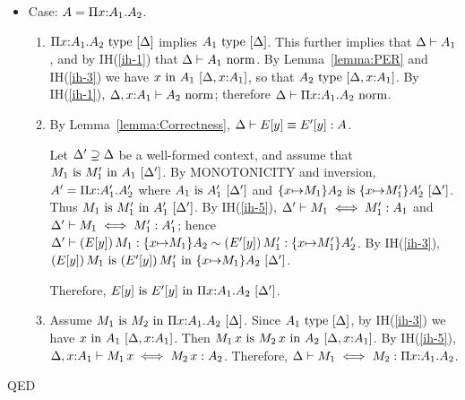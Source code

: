 \documentclass{article}
\theoremstyle{break}
\newcommand{\qed}{\mbox{QED}}
\newenvironment{proof}{\noindent{\bf Proof:}\hspace*{0.5em}}{\hspace*{\fill}\qed}
\begin{document}
\begin{proof}
\begin{itemize}
\item Case: $\kind=\kpi{\cvar}{\kind_1}{\kind_2}$.
\begin{enumerate}

\item 
$\semanticvalidtype{\world}{\kpi{\cvar}{\kind_1}{\kind_2}}$ implies
$\semanticvalidtype{\world}{\kind_1}$.  This further implies that
$\validkind{\world}{\kind_1}$, and
by IH(\ref{ih-1}) that $\normtype{\world}{\kind_1}$.
By Lemma~\ref{lemma:PER} and
IH(\ref{ih-3}) we have 
$\semanticvalidterm{\world,\cvar{:}\kind_1}{\cvar}{\kind_1}$,
so that
$\semanticvalidtype{\world,\cvar{:}\kind_1}{\kind_2}$.  By IH(\ref{ih-1}),
$\normtype{\world,\cvar{:}\kind_1}{\kind_2}$; therefore
$\normtype{\world}{\kpi{\cvar}{\kind_1}{\kind_2}}$.

\item By Lemma~\ref{lemma:Correctness}, 
$\equivconstructor{\world}{E[\othercvar]}{E'[\othercvar]}{\kind}$.


Let $\world'\supseteq\world$ be a well-formed context, and assume that
$\semanticequivterm{\world'}{\constructor_1}{\constructor'_1}{\kind_1}$.
By MONOTONICITY and inversion, 
$\kind' = \kpi{\cvar}{\kind'_1}{\kind'_2}$ where
$\semanticequivtype{\world'}{\kind_1}{\kind'_1}$ and
$\semanticequivtype{\world'}{\substitute{\cvar}{\constructor_1}{\kind_2}}
   {\substitute{\cvar}{\constructor'_1}{\kind'_2}}$.
Thus $\semanticequivterm{\world'}{\constructor_1}{\constructor'_1}{\kind'_1}$.
By IH(\ref{ih-5}), 
$\aconequiv{\world'}{\constructor_1}{\constructor'_1}{\kind_1}$ and
$\aconequiv{\world'}{\constructor_1}{\constructor'_1}{\kind'_1}$;
hence 
$\weakconequiv{\world'}{\capply{(E[\othercvar])}{\constructor_1}}{\substitute{\cvar}{\constructor_1}{\kind_2}}
   {\capply{(E'[\othercvar])}{\constructor'_1}}{\substitute{\cvar}{\constructor'_1}{\kind'_2}}$.
By IH(\ref{ih-3}), 
$\semanticequivterm{\world'}{\capply{(E[\othercvar])}{\constructor_1}}
   {\capply{(E'[\othercvar])}{\constructor'_1}}{\substitute{\cvar}{\constructor_1}{\kind_2}}$.

Therefore, 
$\semanticequivterm{\world'}{E[\othercvar]}{E'[\othercvar]}{\kpi{\cvar}{\kind_1}{\kind_2}}$.

\item 
Assume $\semanticequivterm{\world}{\constructor_1}{\constructor_2}{\kpi{\cvar}{\kind_1}{\kind_2}}$.
Since $\semanticvalidtype{\world}{\kind_1}$, by
IH(\ref{ih-3}) we have
$\semanticvalidterm{\world,\cvar{:}\kind_1}{\cvar}{\kind_1}$.  Then
$\semanticequivterm{\world,\cvar{:}{\kind_1}}{\capply{\constructor_1}{\cvar}}
   {\capply{\constructor_2}{\cvar}}{\kind_2}$.
By IH(\ref{ih-5}), 
$\aconequiv{\world,\cvar{:}{\kind_1}}{\capply{\constructor_1}{\cvar}}
   {\capply{\constructor_2}{\cvar}}{\kind_2}$.
Therefore,
$\aconequiv{\world}{\constructor_1}{\constructor_2}{\kpi{\cvar}{\kind_1}{\kind_2}}$.


\end{enumerate}
\end{itemize}
\end{proof}
\end{document}
